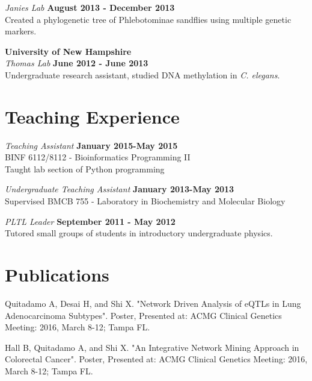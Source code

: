 \documentclass[margin,line]{res}
\begin{document}
\begin{resume}
{\em Janies Lab} \hfill {\bf August 2013 - December 2013}\\
Created a phylogenetic tree of Phlebotominae sandflies using multiple genetic markers.    
\hspace*{.05in} 

{\bf University of New Hampshire}\\
{\em Thomas Lab} \hfill {\bf June 2012 - June 2013}\\
Undergraduate research assistant, studied DNA methylation in {\em C. elegans}.\\ 


\section{\sc Teaching Experience}

{\em Teaching Assistant} \hfill {\bf January 2015-May 2015}\\
BINF 6112/8112 - Bioinformatics Programming II\\
Taught lab section of Python programming

{\em Undergraduate Teaching Assistant} \hfill {\bf January 2013-May 2013}\\
Supervised BMCB 755 - Laboratory in Biochemistry and Molecular Biology

{\em PLTL Leader} \hfill {\bf September 2011 - May 2012}\\
Tutored small groups of students in introductory undergraduate physics.

\section{\sc Publications}

Quitadamo A, Desai H, and Shi X. "Network Driven Analysis of eQTLs in Lung Adenocarcinoma Subtypes". Poster, Presented at: ACMG Clinical Genetics Meeting: 2016, March 8-12; Tampa FL.

Hall B, Quitadamo A, and Shi X. "An Integrative Network Mining Approach in Colorectal Cancer". Poster, Presented at: ACMG Clinical Genetics Meeting: 2016, March 8-12; Tampa FL.


\end{resume}
\end{document}
